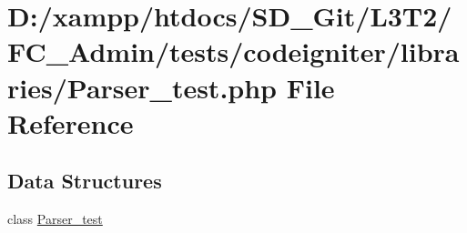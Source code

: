 \hypertarget{_admin_2tests_2codeigniter_2libraries_2_parser__test_8php}{}\section{D\+:/xampp/htdocs/\+S\+D\+\_\+\+Git/\+L3\+T2/\+F\+C\+\_\+\+Admin/tests/codeigniter/libraries/\+Parser\+\_\+test.php File Reference}
\label{_admin_2tests_2codeigniter_2libraries_2_parser__test_8php}
\subsection*{Data Structures}
\begin{DoxyCompactItemize}
\item 
class \hyperlink{class_parser__test}{Parser\+\_\+test}
\end{DoxyCompactItemize}
